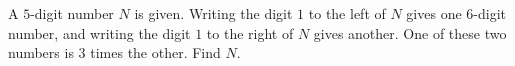 A $5$-digit number $N$ is given. Writing the digit $1$ to the left of $N$ gives one $6$-digit number, and writing the digit $1$ to the right of $N$ gives another. One of these two numbers is $3$ times the other. Find $N$.
